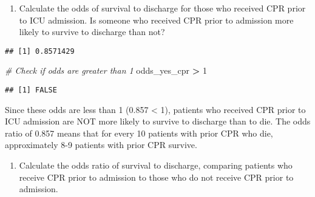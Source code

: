 \documentclass[
]{article}
\newenvironment{Shaded}{\begin{snugshade}}{\end{snugshade}}
\newcommand{\CommentTok}[1]{\textcolor[rgb]{0.56,0.35,0.01}{\textit{#1}}}
\newcommand{\DecValTok}[1]{\textcolor[rgb]{0.00,0.00,0.81}{#1}}
\newcommand{\FunctionTok}[1]{\textcolor[rgb]{0.13,0.29,0.53}{\textbf{#1}}}
\newcommand{\NormalTok}[1]{#1}
\newcommand{\OtherTok}[1]{\textcolor[rgb]{0.56,0.35,0.01}{#1}}
\newcommand{\SpecialCharTok}[1]{\textcolor[rgb]{0.81,0.36,0.00}{\textbf{#1}}}
\newcommand{\StringTok}[1]{\textcolor[rgb]{0.31,0.60,0.02}{#1}}
\providecommand{\tightlist}{%
  \setlength{\itemsep}{0pt}\setlength{\parskip}{0pt}}
\begin{document}
\begin{enumerate}
\def\labelenumi{\alph{enumi})}
\setcounter{enumi}{1}
\tightlist
\item
  Calculate the odds of survival to discharge for those who received CPR
  prior to ICU admission. Is someone who received CPR prior to admission
  more likely to survive to discharge than not?
\end{enumerate}

\begin{Shaded}
\end{Shaded}

\begin{verbatim}
## [1] 0.8571429
\end{verbatim}

\begin{Shaded}
\begin{Highlighting}[]
\CommentTok{\# Check if odds are greater than 1}
\NormalTok{odds\_yes\_cpr }\SpecialCharTok{\textgreater{}} \DecValTok{1}
\end{Highlighting}
\end{Shaded}

\begin{verbatim}
## [1] FALSE
\end{verbatim}

Since these odds are less than 1 (0.857 \textless{} 1), patients who
received CPR prior to ICU admission are NOT more likely to survive to
discharge than to die. The odds ratio of 0.857 means that for every 10
patients with prior CPR who die, approximately 8-9 patients with prior
CPR survive.

\begin{enumerate}
\def\labelenumi{\alph{enumi})}
\setcounter{enumi}{2}
\tightlist
\item
  Calculate the odds ratio of survival to discharge, comparing patients
  who receive CPR prior to admission to those who do not receive CPR
  prior to admission.
\end{enumerate}
\end{document}
